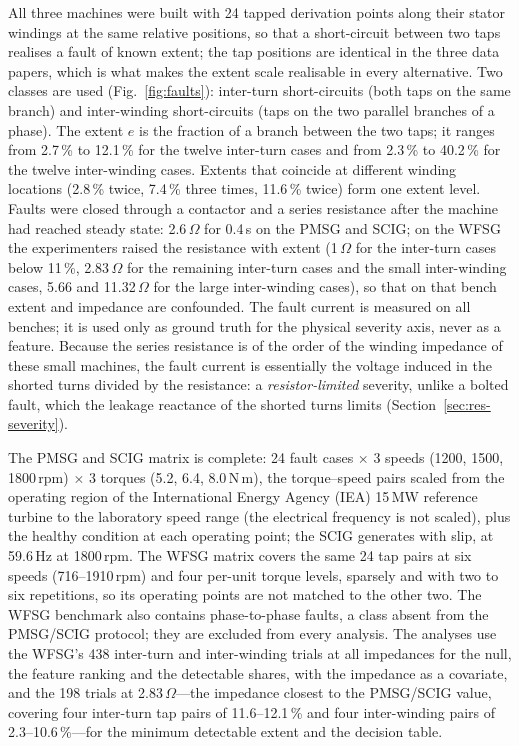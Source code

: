 All three machines were built with 24 tapped derivation points along their stator windings at the same relative positions, so that a short-circuit between two taps realises a fault of known extent; the tap positions are identical in the three data papers, which is what makes the extent scale realisable in every alternative. Two classes are used (Fig.~\ref{fig:faults}): inter-turn short-circuits (both taps on the same branch) and inter-winding short-circuits (taps on the two parallel branches of a phase). The extent $e$ is the fraction of a branch between the two taps; it ranges from 2.7\,\% to 12.1\,\% for the twelve inter-turn cases and from 2.3\,\% to 40.2\,\% for the twelve inter-winding cases. Extents that coincide at different winding locations (2.8\,\% twice, 7.4\,\% three times, 11.6\,\% twice) form one extent level. Faults were closed through a contactor and a series resistance after the machine had reached steady state: 2.6\,$\Omega$ for 0.4\,s on the PMSG and SCIG; on the WFSG the experimenters raised the resistance with extent (1\,$\Omega$ for the inter-turn cases below 11\,\%, 2.83\,$\Omega$ for the remaining inter-turn cases and the small inter-winding cases, 5.66 and 11.32\,$\Omega$ for the large inter-winding cases), so that on that bench extent and impedance are confounded. The fault current is measured on all benches; it is used only as ground truth for the physical severity axis, never as a feature. Because the series resistance is of the order of the winding impedance of these small machines, the fault current is essentially the voltage induced in the shorted turns divided by the resistance: a \emph{resistor-limited} severity, unlike a bolted fault, which the leakage reactance of the shorted turns limits (Section~\ref{sec:res-severity}).



The PMSG and SCIG matrix is complete: 24 fault cases $\times$ 3 speeds (1200, 1500, 1800\,rpm) $\times$ 3 torques (5.2, 6.4, 8.0\,N\,m), the torque--speed pairs scaled from the operating region of the International Energy Agency (IEA) 15\,MW reference turbine \citep{Gaertner2020} to the laboratory speed range (the electrical frequency is not scaled), plus the healthy condition at each operating point; the SCIG generates with slip, at 59.6\,Hz at 1800\,rpm. The WFSG matrix covers the same 24 tap pairs at six speeds (716--1910\,rpm) and four per-unit torque levels, sparsely and with two to six repetitions, so its operating points are not matched to the other two. The WFSG benchmark also contains phase-to-phase faults, a class absent from the PMSG/SCIG protocol; they are excluded from every analysis. The analyses use the WFSG's 438 inter-turn and inter-winding trials at all impedances for the null, the feature ranking and the detectable shares, with the impedance as a covariate, and the 198 trials at 2.83\,$\Omega$---the impedance closest to the PMSG/SCIG value, covering four inter-turn tap pairs of 11.6--12.1\,\% and four inter-winding pairs of 2.3--10.6\,\%---for the minimum detectable extent and the decision table.

